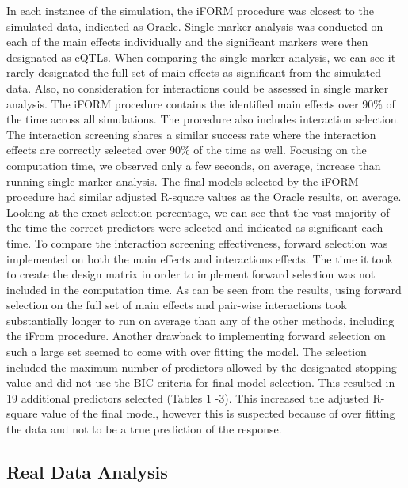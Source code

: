 \documentclass[]{book}
\theoremstyle{definition}
\theoremstyle{definition}
\theoremstyle{remark}
\begin{document}
In each instance of the simulation, the iFORM procedure was closest to
the simulated data, indicated as Oracle. Single marker analysis was
conducted on each of the main effects individually and the significant
markers were then designated as eQTLs. When comparing the single marker
analysis, we can see it rarely designated the full set of main effects
as significant from the simulated data. Also, no consideration for
interactions could be assessed in single marker analysis. The iFORM
procedure contains the identified main effects over 90\% of the time
across all simulations. The procedure also includes interaction
selection. The interaction screening shares a similar success rate where
the interaction effects are correctly selected over 90\% of the time as
well. Focusing on the computation time, we observed only a few seconds,
on average, increase than running single marker analysis. The final
models selected by the iFORM procedure had similar adjusted R-square
values as the Oracle results, on average. Looking at the exact selection
percentage, we can see that the vast majority of the time the correct
predictors were selected and indicated as significant each time. To
compare the interaction screening effectiveness, forward selection was
implemented on both the main effects and interactions effects. The time
it took to create the design matrix in order to implement forward
selection was not included in the computation time. As can be seen from
the results, using forward selection on the full set of main effects and
pair-wise interactions took substantially longer to run on average than
any of the other methods, including the iFrom procedure. Another
drawback to implementing forward selection on such a large set seemed to
come with over fitting the model. The selection included the maximum
number of predictors allowed by the designated stopping value and did
not use the BIC criteria for final model selection. This resulted in 19
additional predictors selected (Tables 1 -3). This increased the
adjusted R-square value of the final model, however this is suspected
because of over fitting the data and not to be a true prediction of the
response.

\subsection{Real Data Analysis}\label{real-data-analysis}
\end{document}
